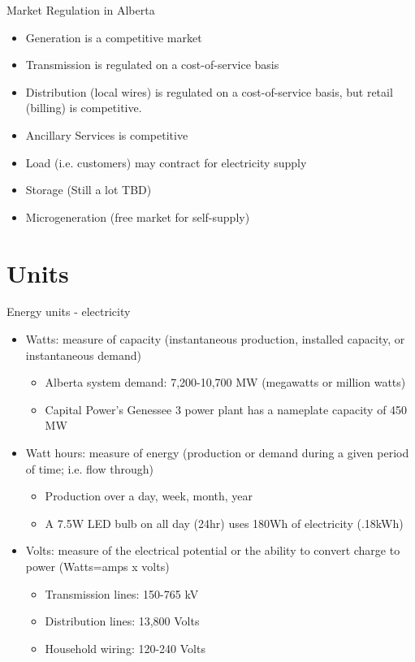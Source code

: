 \documentclass[aspectratio=169]{beamer}
\renewcommand{\(}{\begin{columns}}
\renewcommand{\)}{\end{columns}}
\newcommand{\<}[1]{\begin{column}{#1}}
\renewcommand{\>}{\end{column}}
\begin{document}
\begin{frame}{Market Regulation in Alberta}
\begin{itemize}
\setlength\itemsep{1.7em}
\item Generation is a competitive market

\item Transmission is regulated on a cost-of-service basis

\item Distribution (local wires) is regulated on a cost-of-service basis, but retail (billing) is competitive.

\item Ancillary Services is competitive

\item Load (i.e. customers) may contract for electricity supply

\item Storage (Still a lot TBD)

\item Microgeneration (free market for self-supply)
\end{itemize}

\vfill \end{frame}


\section{Units}

\begin{frame}{Energy units - electricity}
\begin{itemize}
\setlength\itemsep{.75em}
\item Watts: measure of capacity (instantaneous production, installed capacity, or instantaneous demand)
\begin{itemize}
\setlength\itemsep{.5em}
\item Alberta system demand: 7,200-10,700 MW (megawatts or million watts)
\item Capital Power's Genessee 3 power plant has a nameplate capacity of 450 MW
\end{itemize}
\item Watt hours: measure of energy (production or demand during a given period of time; i.e. flow through)
\begin{itemize}
\setlength\itemsep{.5em}
\item Production over a day, week, month, year
\item A 7.5W LED bulb on all day (24hr) uses 180Wh of electricity (.18kWh)
\end{itemize}
\item Volts: measure of the electrical potential or the ability to convert charge to power (Watts=amps x volts)
\begin{itemize}
\setlength\itemsep{.5em}
\item Transmission lines: 150-765 kV
\item Distribution lines: 13,800 Volts
\item Household wiring: 120-240 Volts
\end{itemize}
\end{itemize}
\vfill \end{frame}
\end{document}

